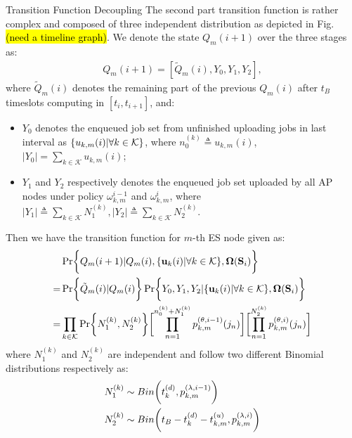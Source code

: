 \documentclass[10pt, conference, letterpaper]{IEEEtran}
\newcommand{\define}{\triangleq}
\renewcommand{\vec}{\mathbf}
\DeclarePairedDelimiter{\set}{\{}{\}}
\DeclarePairedDelimiter{\Paren}{\bigg(}{\bigg)}
\DeclarePairedDelimiter{\Bracket}{\bigg[}{\bigg]}
\DeclarePairedDelimiter{\Brace}{\bigg\{}{\bigg\}}
\newcommand{\apSet}{\mathcal{K}}
\newcommand{\Stat}{\mathbf{S}}
\newcommand{\Policy}{\mathbf{\Omega}}
\begin{document}
\begin{section}{Transition Function Decoupling}
        The second part transition function is rather complex and composed of three independent distribution as depicted in Fig. \hl{(need a timeline graph)}. We denote the state $Q_m(i+1)$ over the three stages as:
        \begin{align*}
            Q_m(i+1) = [\tilde{Q}_m(i), Y_0, Y_1, Y_2],
        \end{align*}
        where $\tilde{Q}_m(i)$ denotes the remaining part of the previous $Q_m(i)$ after $t_B$ timeslots computing in $[t_{i}, t_{i+1}]$, and:
        \begin{itemize}
            \item $Y_0$ denotes the enqueued job set from unfinished uploading jobs in last interval as $\set{u_{k,m}(i)|\forall k\in\apSet}$, where $n^{(k)}_0 \define u_{k,m}(i)$, $|Y_0|=\sum_{k\in\apSet} u_{k,m}(i)$;
            \item $Y_1$ and $Y_2$ respectively denotes the enqueued job set uploaded by all AP nodes under policy $\omega_{k,m}^{i-1}$ and $\omega_{k,m}^{i}$, where $|Y_1|\define\sum_{k\in\apSet}N^{(k)}_1, |Y_2|\define\sum_{k\in\apSet}N^{(k)}_2$.
        \end{itemize}
        Then we have the transition function for $m$-th ES node given as:
        \begin{align*}
            & \Pr\Brace{Q_m(i+1)|Q_m(i), \set{\vec{u}_k(i)|\forall k\in\apSet}, \Policy(\Stat_i)}
            \nonumber\\
            =& \Pr\Brace{\tilde{Q}_m(i)|Q_m(i)}
                \Pr\Brace{Y_0, Y_1, Y_2|\set{\vec{u}_k(i)|\forall k\in\apSet}, \Policy(\Stat_i)}
            \nonumber\\
            =& \prod_{k\in\apSet} \Pr\Brace{N^{(k)}_1,N^{(k)}_2}
                \Bracket{
                    \prod_{n=1}^{n^{(k)}_0 + N^{(k)}_1} p^{(\theta, i-1)}_{k,m}(j_n)
                }
                \Bracket{
                    \prod_{n=1}^{N^{(k)}_2} p^{(\theta, i)}_{k,m}(j_n)
                }
        \end{align*}
        where $N^{(k)}_1$ and $N^{(k)}_2$ are independent and follow two different Binomial distributions respectively as:
        \begin{align*}
            N^{(k)}_1 &\sim Bin\Paren{t^{(d)}_k, p^{(\lambda, i-1)}_{k,m}}
            \\
            N^{(k)}_2 &\sim Bin\Paren{t_B-t^{(d)}_k-t^{(u)}_{k,m}, p^{(\lambda, i)}_{k,m}}
        \end{align*}
    \end{section}
    
    
    
\end{document}
